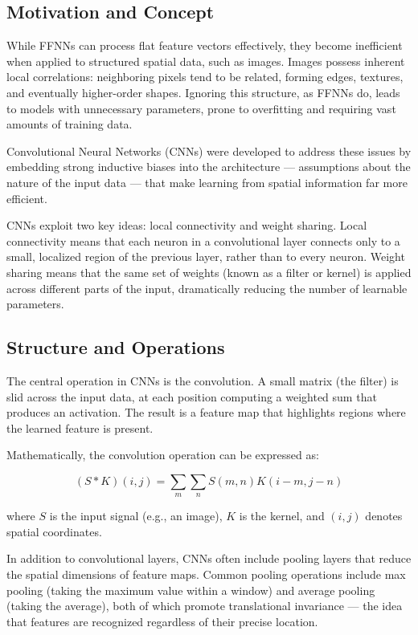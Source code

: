 \documentclass[openany]{book}
\begin{document}
\subsection{Motivation and Concept}

While FFNNs can process flat feature vectors effectively, they become 
inefficient when applied to structured spatial data, such as images. Images 
possess inherent local correlations: neighboring pixels tend to be related, 
forming edges, textures, and eventually higher-order shapes. Ignoring this 
structure, as FFNNs do, leads to models with unnecessary parameters, prone to 
overfitting and requiring vast amounts of training data.

Convolutional Neural Networks (CNNs) were developed to address these issues by 
embedding strong inductive biases into the architecture — assumptions about the 
nature of the input data — that make learning from spatial information far more 
efficient.

CNNs exploit two key ideas: local connectivity and weight sharing. Local 
connectivity means that each neuron in a convolutional layer connects only to a 
small, localized region of the previous layer, rather than to every neuron. 
Weight sharing means that the same set of weights (known as a filter or kernel) 
is applied across different parts of the input, dramatically reducing the number 
of learnable parameters.

\subsection{Structure and Operations}

The central operation in CNNs is the convolution. A small matrix (the filter) is 
slid across the input data, at each position computing a weighted sum that 
produces an activation. The result is a feature map that highlights regions 
where the learned feature is present.

Mathematically, the convolution operation can be expressed as:

\begin{equation}
(S \ast K)(i,j) = \sum_{m} \sum_{n} S(m,n)K(i - m,j - n)
\end{equation}

where $S$ is the input signal (e.g., an image), $K$ is the kernel, and $(i,j)$ 
denotes spatial coordinates.

In addition to convolutional layers, CNNs often include pooling layers that 
reduce the spatial dimensions of feature maps. Common pooling operations include 
max pooling (taking the maximum value within a window) and average pooling 
(taking the average), both of which promote translational invariance — the idea 
that features are recognized regardless of their precise location.
\end{document}
